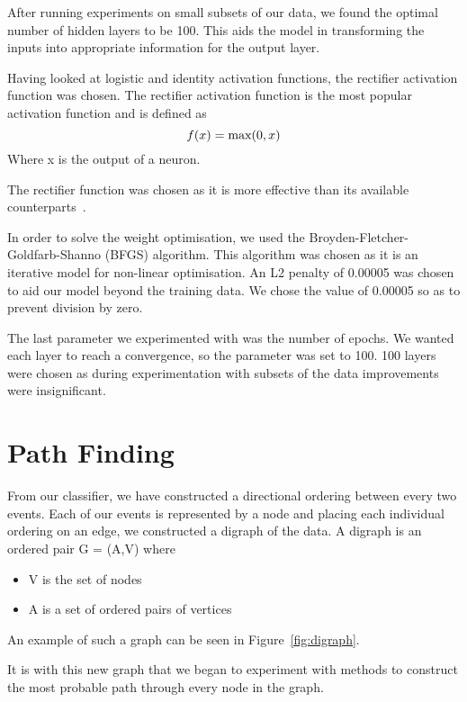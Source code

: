 \documentclass[bsc,frontabs,twoside,singlespacing,parskip,deptreport]{infthesis}     %
\begin{document}
 After running experiments on  small subsets of our data, we found the optimal number of hidden layers to be 100. 
 This aids the model in transforming the inputs into appropriate information  for the output layer.
 
 Having looked at logistic and identity activation functions, the rectifier activation function was chosen.
 The rectifier activation function is the most popular activation function \cite{lecun2015deep} and is defined as
 \begin{equation}
   f(x) = \text{max}(0,x)\nonumber\\
 \end{equation}
 Where x is the output of a neuron.
 
 The rectifier function was chosen as it is more effective than its available counterparts~\cite{glorot2011deep}.

 In order to solve the weight optimisation, we used the Broyden-Fletcher-Goldfarb-Shanno (BFGS) algorithm.
 This algorithm was chosen as it is an iterative model for non-linear optimisation.
 An L2 penalty of 0.00005 was chosen to aid our model beyond the training data.
 We chose the value of 0.00005 so as to prevent division by zero. 

 The last parameter we experimented with was the number of epochs.
 We wanted each layer to reach a convergence, so the parameter was set to 100.
 100 layers were chosen as during experimentation with subsets of the data improvements were
 insignificant.

 \section{Path Finding} \label{chapter:graphing}
From our classifier, we have constructed a directional ordering between every two events.
Each of our events is represented by a node and placing each individual ordering on an edge, we constructed
a digraph of the data.
A digraph is an ordered pair G = (A,V) where~\cite{bang2008digraphs}
\begin{itemize}
  \item V is the set of nodes
  \item A is a set of ordered pairs of vertices
\end{itemize}
An example of such a graph can be seen in Figure~\ref{fig:digraph}.

It is with this new graph that we began to experiment with methods to construct the most probable path through every
node in the graph.
\end{document}
